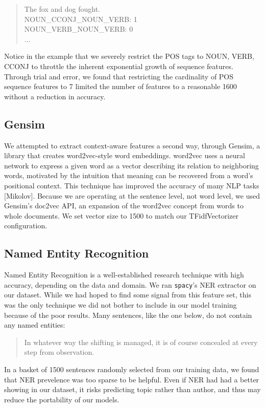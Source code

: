 \documentclass[8pt]{article}
\begin{document}
\begin{enumerate}
  \begin{quote}
  The fox and dog fought. \\
  NOUN\_CCONJ\_NOUN\_VERB: 1\\
  NOUN\_VERB\_NOUN\_VERB: 0\\
  ...
  \end{quote}

  Notice in the example that we severely restrict the POS tags to NOUN, VERB, CCONJ to throttle the inherent exponential growth of sequence features. Through trial and error, we found that restricting the cardinality of POS sequence features to 7 limited the number of features to a reasonable 1600 without a reduction in accuracy.
\end{enumerate}

\subsection{Gensim}
We attempted to extract context-aware features a second way, through Gensim, a library that creates word2vec-style word embeddings. word2vec uses a neural network to express a given word as a vector describing its relation to neighboring words, motivated by the intuition that meaning can be recovered from a word's positional context. This technique has improved the accuracy of many NLP tasks [Mikolov]. Because we are operating at the sentence level, not word level, we used Gensim's doc2vec API, an expansion of the word2vec concept from words to whole documents. We set vector size to 1500 to match our TFidfVectorizer configuration.

\subsection{Named Entity Recognition}
Named Entity Recognition is a well-established research technique with high accuracy, depending on the data and domain. We ran \texttt{spacy}'s NER extractor on our dataset. While we had hoped to find some signal from this feature set, this was the only technique we did not bother to include in our model training because of the poor results. Many sentences, like the one below, do not contain any named entities:

\begin{quote}
In whatever way the shifting is managed, it is of course concealed at every step from observation.
\end{quote}

In a basket of 1500 sentences randomly selected from our training data, we found that NER prevelence was too sparse to be helpful. Even if NER had had a better showing in our dataset, it risks predicting topic rather than author, and thus may reduce the portability of our models. 
\end{document}
